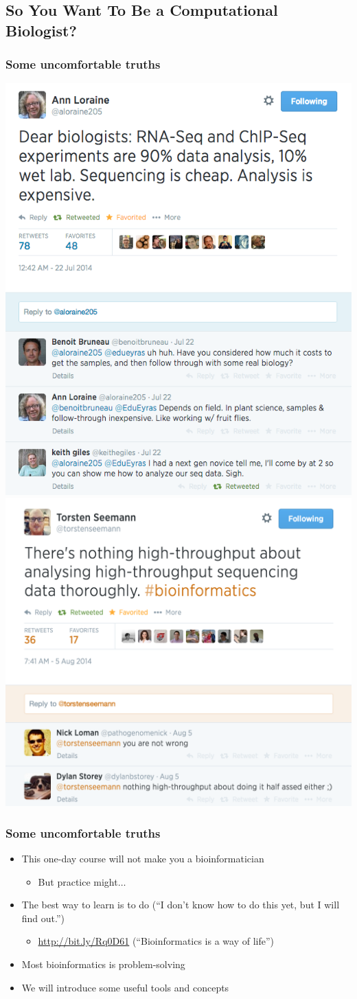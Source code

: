 \subsection{So You Want To Be a Computational Biologist?}
\begin{frame}
  \frametitle{Some uncomfortable truths}
  \includegraphics[width=.5\textwidth]{images/twitter_rnaseq}
  \includegraphics[width=.5\textwidth]{images/twitter_high_throughput}  
\end{frame}

\begin{frame}
  \frametitle{Some uncomfortable truths}
  \begin{itemize}
    \item<1-> This one-day course will not make you a bioinformatician
    \begin{itemize}
      \item<2-> But practice might$\ldots$
    \end{itemize}
    \item<3-> The best way to learn is to do (``I don't know how to do this yet, but I will find out.'')
    \begin{itemize}
      \item \url{http://bit.ly/Rq0D61} (``Bioinformatics is a way of life'')
    \end{itemize}
    \item<3-> Most bioinformatics is problem-solving
    \item<3-> We will introduce some useful tools and concepts
  \end{itemize}
\end{frame}

